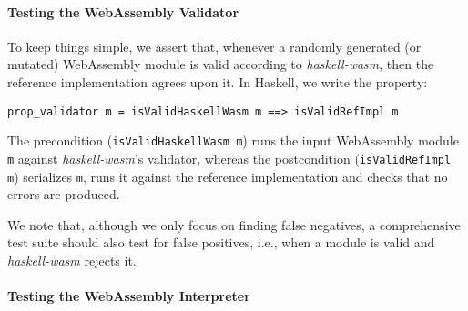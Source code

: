 \documentclass[sigconf, anonymous, review]{acmart}
\begin{document}

\paragraph{Testing the WebAssembly Validator}

To keep things simple, we assert that, whenever a randomly generated (or
mutated) WebAssembly module is valid according to \textit{haskell-wasm}, then
the reference implementation agrees upon it.
%
%
In Haskell, we write the property:

\begin{verbatim}
prop_validator m = isValidHaskellWasm m ==> isValidRefImpl m
\end{verbatim}

\noindent The precondition (\texttt{isValidHaskellWasm m}) runs the input
WebAssembly module \texttt{m} against \textit{haskell-wasm}'s validator, whereas
the postcondition (\texttt{isValidRefImpl m}) serializes \texttt{m}, runs it
against the reference implementation and checks that no errors are produced.

We note that, although we only focus on finding false negatives, a comprehensive
test suite should also test for false positives, i.e., when a module is valid
and \textit{haskell-wasm} rejects it.
%
%




\paragraph{Testing the WebAssembly Interpreter}
\end{document}
